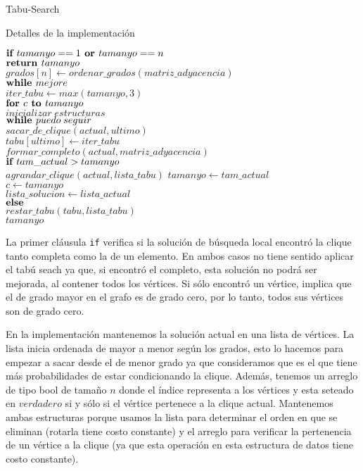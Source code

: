 \begin{section}{Tabu-Search}
\begin{subsection}{Detalles de la implementación}
			\begin{pseudo}
				\tab $\textbf{if } tamanyo==1 \textbf{ or } tamanyo==n$\\
				\tab \tab $\textbf{return } tamanyo$\\
				\tab $grados[n] \leftarrow ordenar\_grados(matriz\_adyacencia)$\\
				\tab $\textbf{while } mejore$\\
				\tab \tab $iter\_tabu \leftarrow max(tamanyo,3)$\\
				\tab \tab $\textbf{for } c \textbf{ to } tamanyo$\\
				\tab \tab \tab $inicializar\;estructuras$\\
				\tab \tab \tab $\textbf{while } puedo\;seguir$\\
				\tab \tab \tab \tab $sacar\_de\_clique(actual,ultimo)$\\
				\tab \tab \tab \tab $tabu[ultimo] \leftarrow iter\_tabu$\\
				\tab \tab \tab \tab $formar\_completo(actual,matriz\_adyacencia)$\\
				\tab \tab \tab \tab $\textbf{if } tam\_actual>tamanyo$\\
				\tab \tab \tab \tab \tab $agrandar\_clique(actual,lista\_tabu)$
				\tab \tab \tab \tab \tab $tamanyo \leftarrow tam\_actual$\\
				\tab \tab \tab \tab \tab $c \leftarrow tamanyo$\\
				\tab \tab \tab \tab \tab $lista\_solucion \leftarrow lista\_actual$\\
				\tab \tab \tab \tab $\textbf{else }$\\
				\tab \tab \tab \tab \tab $restar\_tabu(tabu,lista\_tabu)$\\
				\tab \RET $tamanyo$\\
			\end{pseudo}

		La primer cláusula \texttt{if} verifica si la solución de búsqueda local encontró la clique tanto completa como la de un elemento. En ambos casos no tiene sentido aplicar el tabú seach ya que, si encontró el completo, esta solución no podrá ser mejorada, al contener todos los vértices. Si sólo encontró un vértice, implica que el de grado mayor en el grafo es de grado cero, por lo tanto, todos sus vértices son de grado cero. 

		En la implementación mantenemos la solución actual en una lista de vértices. La lista inicia ordenada de mayor a menor según los grados, esto lo hacemos para empezar a sacar desde el de menor grado ya que consideramos que es el que tiene más probabilidades de estar condicionando la clique. Además, tenemos un arreglo de tipo bool de tamaño $n$ donde el índice representa a los vértices y esta seteado en $verdadero$ si y sólo si el vértice pertenece a la clique actual. Mantenemos ambas estructuras porque usamos la lista para determinar el orden en que se eliminan (rotarla tiene costo constante) y el arreglo para verificar la pertenencia de un vértice a la clique (ya que esta operación en esta estructura de datos tiene costo constante).


\end{subsection}
\end{section}
